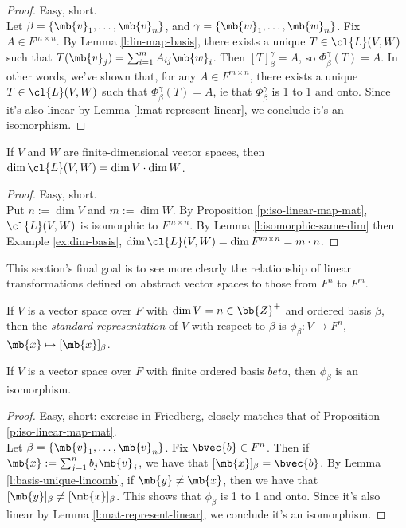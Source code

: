 \begin{proof}
Easy, short.\\
Let $\beta= \{ \mb{v}_1, \ldots, \mb{v}_n\}$, and $\gamma= \{ \mb{w}_1, \ldots, \mb{w}_n \}$. Fix $A \in F^{m \times n}$. By Lemma \ref{l:lin-map-basis}, there exists a unique $T \in \cl{L}(V,W)$ such that $T( \mb{v}_j)= \sum_{i=1}^mA_{ij}\mb{w}_i$.
Then $[T]_\beta^\gamma =A$, so $\Phi_\beta^\gamma (T)=A$. In other words, we've shown that, for any $A \in F^{m \times n}$, there exists a unique $T \in \cl{L}(V,W)$ such that $\Phi_\beta^\gamma (T)=A$, ie that $\Phi_\beta^\gamma$ is 1 to 1 and onto.
Since it's also linear by Lemma \ref{l:mat-represent-linear}, we conclude it's an isomorphism.
\end{proof}
\begin{corollary}\label{c:lin-trans-dim}
If $V$ and $W$ are finite-dimensional vector spaces, then $\dim \cl{L}(V,W)= \dim V \cdot \dim W$.
\end{corollary}
\begin{proof}
Easy, short.\\
Put $n:= \dim V$ and $m:= \dim W$. By Proposition \ref{p:iso-linear-map-mat}, $\cl{L}(V,W)$ is isomorphic to $F^{m \times n}$. By Lemma \ref{l:isomorphic-same-dim} then Example \ref{ex:dim-basis}, $\dim \cl{L}(V,W)= \dim F^{m \times n}=m \cdot n$.
\end{proof}
This section's final goal is to see more clearly the relationship of linear transformations defined on abstract vector spaces to those from $F^n$ to $F^m$.
\begin{defn}
If $V$ is a vector space over $F$ with $\dim V=n \in \bb{Z}^+$ and ordered basis $\beta$, then the \emph{standard representation} of $V$ with respect to $\beta$ is $\phi_\beta:V \to F^n$, $\mb{x}\mapsto [ \mb{x}]_\beta$.
\end{defn}
\begin{lem}\label{l:std-repr-iso}
If $V$ is a vector space over $F$ with finite ordered basis $beta$, then $\phi_\beta$ is an isomorphism.
\end{lem}
\begin{proof}
Easy, short: exercise in Friedberg, closely matches that of Proposition \ref{p:iso-linear-map-mat}.\\
Let $\beta= \{ \mb{v}_1, \ldots, \mb{v}_n \}$. Fix $\bvec{b}\in F^n$. Then if $\mb{x}:= \sum_{j=1}^nb_j \mb{v}_j$, we have that $[ \mb{x}]_\beta= \bvec{b}$. By Lemma \ref{l:basis-unique-lincomb}, if $\mb{y}\neq \mb{x}$, then we have that $[ \mb{y}]_\beta \neq [ \mb{x}]_\beta$.
This shows that $\phi_\beta$ is 1 to 1 and onto. Since it's also linear by Lemma \ref{l:mat-represent-linear}, we conclude it's an isomorphism.
\end{proof}
